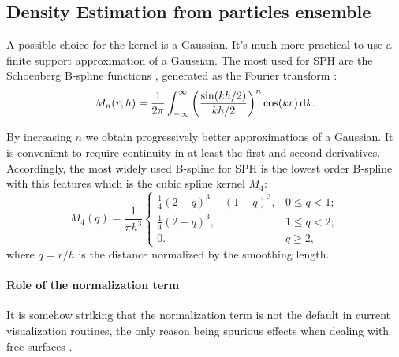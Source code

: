 

\subsection{Density Estimation from particles ensemble}
A possible choice for the kernel is a Gaussian.
It's much more practical to use a finite support approximation of a Gaussian.
The most used for SPH are the Schoenberg  B-spline functions \citep{Schoenberg1988}, generated as the Fourier transform \citep{Price2012}:
\begin{equation}
M_n(r, h) = \frac{1}{2\pi}\int_{-\infty}^{\infty}{\left(\frac{\sin(kh/2)}{kh/2}\right)^n\cos(kr)\operatorname{d}\!{k}}.
\end{equation}

By increasing $n$ we obtain progressively better approximations of a Gaussian.
It is convenient to require continuity in at least the first and second derivatives.
Accordingly, the most widely used B-spline for SPH is the lowest order B-spline with this features which is the cubic spline kernel $M_4$:
\begin{equation}
M_4(q) = \frac{1}{\pi h^3} \left\{
\begin{array}{ll}
\frac{1}{4}(2-q)^3 - (1 - q)^{3}, & 0 \le q < 1; \\
\frac{1}{4}(2-q)^3, & 1 \le q < 2; \\
0. & q \ge 2,
\end{array}
\right.
\label{eq:cubicspline}
\end{equation}
where $q=r/h$ is the distance normalized by the smoothing length.

\paragraph{Role of the normalization term}
It is somehow striking that the normalization term is not the default in current visualization routines, the only reason being spurious effects when dealing with free surfaces \citep{Price2007}.

